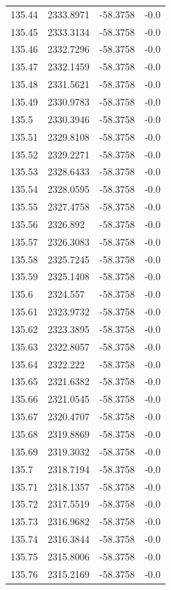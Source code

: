 \begin{table}[H]
\begin{tabular}{llll}
135.44 & 2333.8971 & -58.3758 & -0.0 \\
135.45 & 2333.3134 & -58.3758 & -0.0 \\
135.46 & 2332.7296 & -58.3758 & -0.0 \\
135.47 & 2332.1459 & -58.3758 & -0.0 \\
135.48 & 2331.5621 & -58.3758 & -0.0 \\
135.49 & 2330.9783 & -58.3758 & -0.0 \\
135.5 & 2330.3946 & -58.3758 & -0.0 \\
135.51 & 2329.8108 & -58.3758 & -0.0 \\
135.52 & 2329.2271 & -58.3758 & -0.0 \\
135.53 & 2328.6433 & -58.3758 & -0.0 \\
135.54 & 2328.0595 & -58.3758 & -0.0 \\
135.55 & 2327.4758 & -58.3758 & -0.0 \\
135.56 & 2326.892 & -58.3758 & -0.0 \\
135.57 & 2326.3083 & -58.3758 & -0.0 \\
135.58 & 2325.7245 & -58.3758 & -0.0 \\
135.59 & 2325.1408 & -58.3758 & -0.0 \\
135.6 & 2324.557 & -58.3758 & -0.0 \\
135.61 & 2323.9732 & -58.3758 & -0.0 \\
135.62 & 2323.3895 & -58.3758 & -0.0 \\
135.63 & 2322.8057 & -58.3758 & -0.0 \\
135.64 & 2322.222 & -58.3758 & -0.0 \\
135.65 & 2321.6382 & -58.3758 & -0.0 \\
135.66 & 2321.0545 & -58.3758 & -0.0 \\
135.67 & 2320.4707 & -58.3758 & -0.0 \\
135.68 & 2319.8869 & -58.3758 & -0.0 \\
135.69 & 2319.3032 & -58.3758 & -0.0 \\
135.7 & 2318.7194 & -58.3758 & -0.0 \\
135.71 & 2318.1357 & -58.3758 & -0.0 \\
135.72 & 2317.5519 & -58.3758 & -0.0 \\
135.73 & 2316.9682 & -58.3758 & -0.0 \\
135.74 & 2316.3844 & -58.3758 & -0.0 \\
135.75 & 2315.8006 & -58.3758 & -0.0 \\
135.76 & 2315.2169 & -58.3758 & -0.0 \\

\end{tabular}
\end{table}

